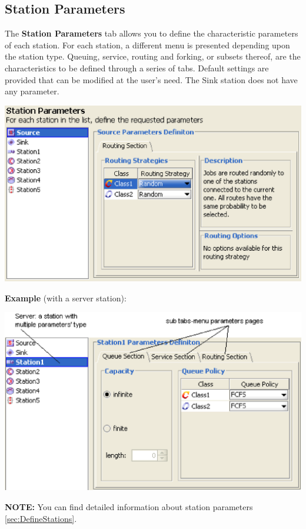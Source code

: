 \subsection{Station Parameters}
\label{sec:StationParameters}
The \textbf{Station Parameters} tab allows you to define the characteristic parameters of each station.
For each station, a different menu is presented depending upon the station type. Queuing, service, routing and forking, or subsets thereof, are the characteristics to be defined through a series of tabs. Default settings are provided that can be modified at the user's need. The Sink station does not have any parameter.
\begin{center}
\includegraphics[scale=.5]{img/jsim/station_parameters1.eps}
\end{center}
\textbf{Example }(with a server station):
\begin{center}
\includegraphics[scale=.5]{img/jsim/sub_tabs_menu.eps}
\end{center}
\textbf{NOTE:} You can find detailed information about station parameters \ref{sec:DefineStations}.

